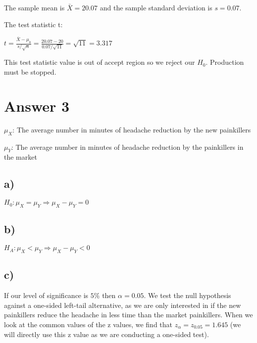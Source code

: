 \documentclass[12pt]{article}
\begin{document}
The sample mean is $\bar{X} = 20.07$ and the sample standard deviation is $s = 0.07$.\par  
The test statistic t:\\ \par 
$t = \frac{\bar{X} - \mu _0}{s/\sqrt{n}} = \frac{20.07 - 20}{0.07/\sqrt{11}} = \sqrt{11} = 3.317$\\ \par 
This test statistic value is out of accept region so we reject our $H_0$. Production must be stopped.
\section*{Answer 3}
$\mu _ X$: The average number in minutes of headache reduction by the new painkillers \par 
$\mu _Y$: The average number in minutes of headache reduction by the painkillers in the market
\subsection*{a)}
$H_0 :\mu _X = \mu _Y \Rightarrow \mu _X - \mu _Y = 0$
\subsection*{b)}
$H_A :\mu _X < \mu _Y \Rightarrow \mu _X - \mu _Y < 0$
\subsection*{c)}
If our level of significance is $5 \%$ then $\alpha = 0.05$. We test the null hypothesis against a one-sided left-tail alternative, as we are only interested in if the new painkillers reduce the headache in less time than the market painkillers. When we look at the common values of the z values, we find that $z_\alpha = z_{0.05} = 1.645$ (we will directly use this z value as we are conducting a one-sided test).\\ \par

\end{document}

